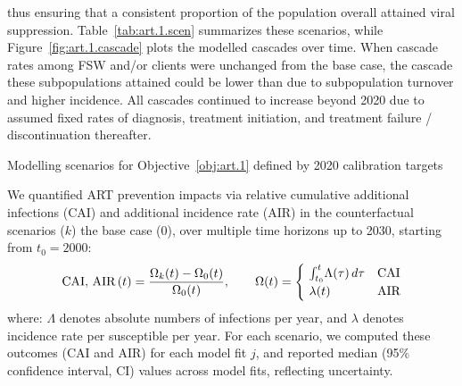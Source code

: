thus ensuring that a consistent proportion of the population overall
attained viral suppression.
Table~\ref{tab:art.1.scen} summarizes these scenarios, while
Figure~\ref{fig:art.1.cascade} plots the modelled cascades over time.
When cascade rates among FSW and/or clients were unchanged from the base case,
the cascade these subpopulations attained could be lower than \cashi
due to subpopulation turnover and higher incidence.
All cascades continued to increase beyond 2020 due to assumed fixed rates of
diagnosis, treatment initiation, and treatment failure / discontinuation thereafter.
\begin{table}
  \centering
  \caption{Modelling scenarios for Objective~\ref{obj:art.1} defined by 2020 calibration targets}
  \label{tab:art.1.scen}
  
\end{table}
\par
We quantified ART prevention impacts via relative
cumulative additional infections (CAI) and additional incidence rate (AIR)
in the counterfactual scenarios ($k$) \vs the base case ($0$),
over multiple time horizons up to 2030, starting from $t_0 = 2000$:
\begin{equation}
  \textnormal{CAI, AIR}\,(t) = \frac{\Omega_{k}(t) - \Omega_{0}(t)}{\Omega_{0}(t)}
  ,\qquad \Omega(t) =
  \begin{cases}
    ~\int_{t_0}^{t}\!\Lambda(\tau)\,d\tau & \textnormal{CAI} \\
    ~\lambda(t) & \textnormal{AIR}
  \end{cases}
\end{equation} where:
$\Lambda$ denotes absolute numbers of infections per year, and
$\lambda$ denotes incidence rate per susceptible per year.
For each scenario, we computed these outcomes (CAI and AIR) for each model fit $j$,
and reported median (95\% confidence interval, CI) values across model fits, reflecting uncertainty.
